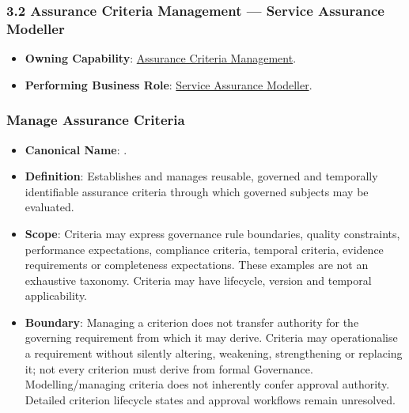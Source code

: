 \subsubsection*{3.2 Assurance Criteria Management — Service Assurance Modeller}
\label{rad:assurance:79}

\begin{itemize}

\item 
\textbf{Owning Capability}: \hyperref[rad:enabling:686]{Assurance Criteria Management}.



\item 
\textbf{Performing Business Role}: \href{https://github.com/fhirfactory/harmonia/blob/98410db60155198a75f74c79d98060070209faa1/docs/markdown/03-business-architecture/actors-roles/roles.md\#service-assurance-modeller}{Service Assurance Modeller}.



\end{itemize}
\label{rad:assurance:82}



\label{rad:assurance:84}
\subsubsection*{Manage Assurance Criteria}
\label{rad:assurance:86}

\begin{itemize}

\item 
\textbf{Canonical Name}: \texttt{}.



\item 
\textbf{Definition}: Establishes and manages reusable, governed and temporally identifiable assurance criteria through which governed subjects may be evaluated.



\item 
\textbf{Scope}: Criteria may express governance rule boundaries, quality constraints, performance expectations, compliance criteria, temporal criteria, evidence requirements or completeness expectations. These examples are not an exhaustive taxonomy. Criteria may have lifecycle, version and temporal applicability.



\item 
\textbf{Boundary}: Managing a criterion does not transfer authority for the governing requirement from which it may derive. Criteria may operationalise a requirement without silently altering, weakening, strengthening or replacing it; not every criterion must derive from formal Governance. Modelling/\allowbreak{}managing criteria does not inherently confer approval authority. Detailed criterion lifecycle states and approval workflows remain unresolved.



\end{itemize}
\label{rad:assurance:91}
